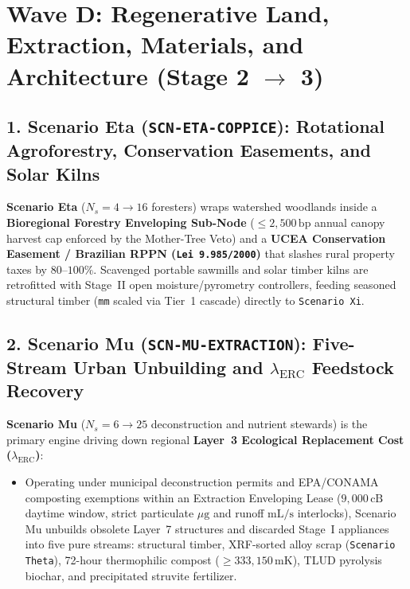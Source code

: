 \section{Wave D: Regenerative Land, Extraction, Materials, and Architecture (Stage 2 $\to$ 3)}
\label{sec:l7-wave-d}

\subsection{1. Scenario Eta (\texttt{SCN-ETA-COPPICE}): Rotational Agroforestry, Conservation Easements, and Solar Kilns}
\textbf{Scenario Eta} ($N_s = 4 \to 16$ foresters) wraps watershed woodlands inside a \textbf{Bioregional Forestry Enveloping Sub-Node} ($\le 2{,}500\,\mathrm{bp}$ annual canopy harvest cap enforced by the Mother-Tree Veto) and a \textbf{UCEA Conservation Easement / Brazilian RPPN (\texttt{Lei 9.985/2000})} that slashes rural property taxes by $80\text{--}100\%$. Scavenged portable sawmills and solar timber kilns are retrofitted with Stage~II open moisture/pyrometry controllers, feeding seasoned structural timber (\texttt{mm} scaled via Tier~1 cascade) directly to \texttt{Scenario Xi}.

\subsection{2. Scenario Mu (\texttt{SCN-MU-EXTRACTION}): Five-Stream Urban Unbuilding and $\lambda_{\mathrm{ERC}}$ Feedstock Recovery}
\textbf{Scenario Mu} ($N_s = 6 \to 25$ deconstruction and nutrient stewards) is the primary engine driving down regional \textbf{Layer~3 Ecological Replacement Cost ($\lambda_{\mathrm{ERC}}$)}:
\begin{itemize}
    \item Operating under municipal deconstruction permits and EPA/CONAMA composting exemptions within an Extraction Enveloping Lease ($9{,}000\,\mathrm{cB}$ daytime window, strict particulate $\mu\mathrm{g}$ and runoff $\mathrm{mL/s}$ interlocks), Scenario Mu unbuilds obsolete Layer~7 structures and discarded Stage~I appliances into five pure streams: structural timber, XRF-sorted alloy scrap (\texttt{Scenario Theta}), 72-hour thermophilic compost ($\ge 333{,}150\,\mathrm{mK}$), TLUD pyrolysis biochar, and precipitated struvite fertilizer.
\end{itemize}

